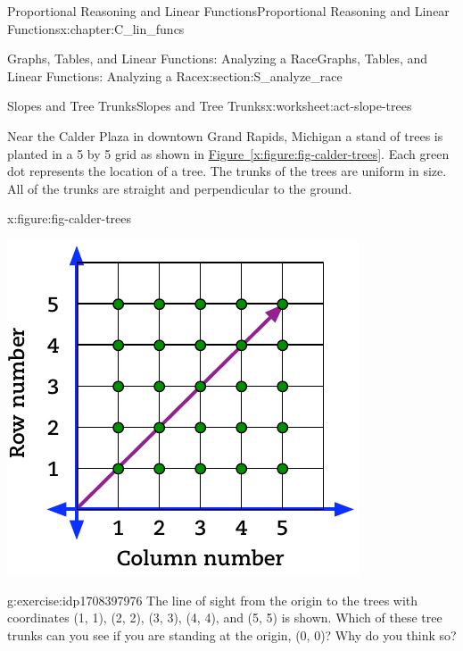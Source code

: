 \documentclass[oneside,10pt,]{book}
\newcommand{\xreffont}{\relax}
\numberwithin{equation}{chapter}
\begin{document}
\begin{chapterptx}{Proportional Reasoning and Linear Functions}{}{Proportional Reasoning and Linear Functions}{}{}{x:chapter:C_lin_funcs}
\begin{sectionptx}{Graphs, Tables, and Linear Functions: Analyzing a Race}{}{Graphs, Tables, and Linear Functions: Analyzing a Race}{}{}{x:section:S_analyze_race}
\typeout{************************************************}
%
\begin{worksheet-subsection}{Slopes and Tree Trunks}{}{Slopes and Tree Trunks}{}{}{x:worksheet:act-slope-trees}
\begin{introduction}{}%
Near the Calder Plaza in downtown Grand Rapids, Michigan a stand of trees is planted in a 5 by 5 grid as shown in \hyperref[x:figure:fig-calder-trees]{Figure~{\xreffont\ref{x:figure:fig-calder-trees}}}. Each green dot represents the location of a tree. The trunks of the trees are uniform in size. All of the trunks are straight and perpendicular to the ground.%
\begin{figureptx}{}{x:figure:fig-calder-trees}{}%
\begin{image}{0.25}{0.5}{0.25}%
\includegraphics[width=\linewidth]{external/calder-trees.pdf}
\end{image}%
\tcblower
\end{figureptx}%
\end{introduction}%
\begin{divisionexercise}{1}{}{}{g:exercise:idp1708397976}%
The line of sight from the origin to the trees with coordinates (1, 1), (2, 2), (3, 3), (4, 4), and (5, 5) is shown. Which of these tree trunks can you see if you are standing at the origin, (0, 0)? Why do you think so?%
\end{divisionexercise}%

\end{worksheet-subsection}
\end{sectionptx}
\end{chapterptx}
\end{document}
